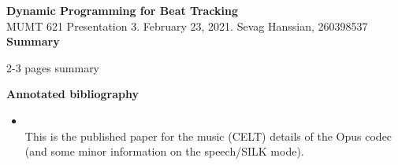 \documentclass[letter,12pt]{report}
\begin{document}
\Large{\textbf{Dynamic Programming for Beat Tracking}}\\
\large{MUMT 621 Presentation 3. February 23, 2021. Sevag Hanssian, 260398537}\\

\Large{\textbf{Summary}}

2-3 pages summary

\vfill
\clearpage

\Large{\textbf{Annotated bibliography}}\\

\begin{itemize}
	\vspace{-1em}
	\item
		\\
		This is the published paper for the music (CELT) details of the Opus codec (and some minor information on the speech/SILK mode).
\end{itemize}
\end{document}
